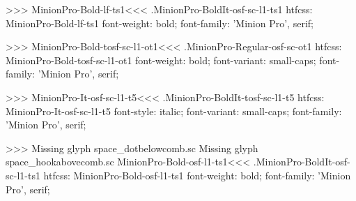 {{>>>
\<MinionPro-Bold-lf-ts1\><<<
.MinionPro-BoldIt-osf-sc-l1-ts1
htfcss:  MinionPro-Bold-lf-ts1  font-weight: bold; font-family: 'Minion Pro', serif;

>>>
\<MinionPro-Bold-tosf-sc-l1-ot1\><<<
.MinionPro-Regular-osf-sc-ot1
htfcss:  MinionPro-Bold-tosf-sc-l1-ot1  font-weight: bold; font-variant: small-caps; font-family: 'Minion Pro', serif;

>>>
\<MinionPro-It-osf-sc-l1-t5\><<<
.MinionPro-BoldIt-tosf-sc-l1-t5
htfcss:  MinionPro-It-osf-sc-l1-t5  font-style: italic; font-variant: small-caps; font-family: 'Minion Pro', serif;

>>>
Missing glyph	space_dotbelowcomb.sc
Missing glyph	space_hookabovecomb.sc
\<MinionPro-Bold-osf-l1-ts1\><<<
.MinionPro-BoldIt-osf-sc-l1-ts1
htfcss:  MinionPro-Bold-osf-l1-ts1  font-weight: bold; font-family: 'Minion Pro', serif;

}}
